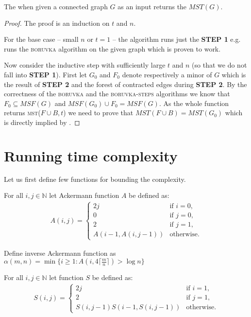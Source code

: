 \begin{theorem}
    The  when given a connected graph $G$ as an input returns the $MST(G)$. 
\end{theorem}
\begin{proof}
The proof is an induction on $t$ and $n$.

For the base case -- small $n$ or $t=1$ -- the algorithm runs just the \textbf{STEP 1} e.g. runs the \textsc{boruvka} algorithm on the given graph which is proven to work.

Now consider the inductive step with sufficiently large $t$ and $n$ (so that we do not fall into \textbf{STEP 1}). First let $G_0$ and $F_0$ denote respectively a minor of $G$ which is the result of \textbf{STEP 2} and the forest of contracted edges during \textbf{STEP 2}. By the correctness of the \textsc{boruvka} and the \textsc{boruvka-steps} algorithms we know that $F_0 \subseteq MSF(G)$ and $MSF(G_{0}) \cup F_{0} = MSF(G)$. As the whole function returns \textsc{mst}($F \cup B, t$) we need to prove that $MST(F \cup B) = MST(G_{0})$ which is directly implied by . 
\end{proof}

\section{Running time complexity}

Let us first define few functions for bounding the complexity.
\begin{definition}    
For all $i, j \in \mathbb{N}$ let Ackermann function $A$ be defined as:
\begin{align*}
    A(i, j) = 
    \begin{cases}
        2j & \text{if $i = 0$,} \\
        0 & \text{if $j = 0$,} \\
        2 & \text{if $j = 1$,} \\
         A(i - 1, A(i, j -1)) & \text{otherwise.}
    \end{cases}
\end{align*}
\end{definition}

\begin{definition}
    Define inverse Ackermann function as $\alpha(m, n) = \min{\{ i \geq 1\colon A(i, 4\lceil\frac{m}n\rceil) > \log{n}\}}$
\end{definition}
\begin{definition}[S function]
For all $i, j \in \mathbb{N}$ let function $S$ be defined as:
\begin{align*}
    S(i, j) = 
    \begin{cases}
        2j & \text{if $i = 1$,} \\
        2 & \text{if $j = 1$,} \\
        S(i, j - 1) S(i-1, S(i, j-1)) & \text{otherwise.}
    \end{cases}
\end{align*}
\end{definition}

